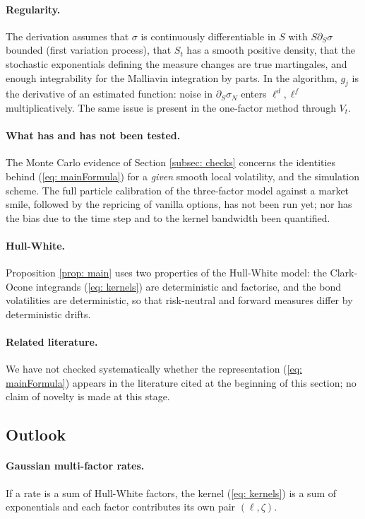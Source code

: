 \paragraph{Regularity.} The derivation assumes that $\sigma$ is continuously differentiable in $S$ with $S\partial_S\sigma$ bounded (first variation process), that $S_t$ has a smooth positive density, that the stochastic exponentials defining the measure changes are true martingales, and enough integrability for the Malliavin integration by parts. In the algorithm, $g_j$ is the derivative of an estimated function: noise in $\partial_S\sigma_N$ enters $\ell^d,\ell^f$ multiplicatively. The same issue is present in the one-factor method through $V_t$.

\paragraph{What has and has not been tested.} The Monte Carlo evidence of Section \ref{subsec: checks} concerns the identities behind (\ref{eq: mainFormula}) for a \emph{given} smooth local volatility, and the simulation scheme. The full particle calibration of the three-factor model against a market smile, followed by the repricing of vanilla options, has not been run yet; nor has the bias due to the time step and to the kernel bandwidth been quantified.

\paragraph{Hull-White.} Proposition \ref{prop: main} uses two properties of the Hull-White model: the Clark-Ocone integrands (\ref{eq: kernels}) are deterministic and factorise, and the bond volatilities are deterministic, so that risk-neutral and forward measures differ by deterministic drifts.

\paragraph{Related literature.} We have not checked systematically whether the representation (\ref{eq: mainFormula}) appears in the literature cited at the beginning of this section; no claim of novelty is made at this stage.

\subsection{Outlook}
\paragraph{Gaussian multi-factor rates.} If a rate is a sum of Hull-White factors, the kernel (\ref{eq: kernels}) is a sum of exponentials and each factor contributes its own pair $(\ell,\zeta)$.

